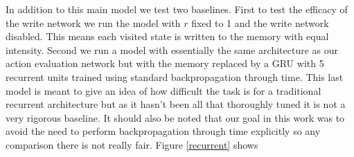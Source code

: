 \documentclass{article}
\begin{document}
In addition to this main model we test two baselines. First to test the efficacy of the write network we run the model with $r$ fixed to 1 and the write network disabled. This means each visited state is written to the memory with equal intensity. Second we run a model with essentially the same architecture as our action evaluation network but with the memory replaced by a GRU with 5 recurrent units trained using standard backpropagation through time. This last model is meant to give an idea of how difficult the task is for a traditional recurrent architecture but as it hasn't been all that thoroughly tuned it is not a very rigorous baseline. It should also be noted that our goal in this work was to avoid the need to perform backpropagation through time explicitly so any comparison there is not really fair. Figure \ref{recurrent} shows  
\end{document}

